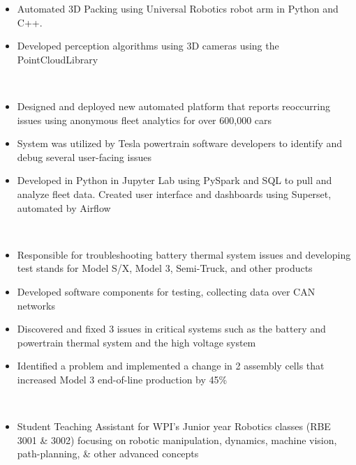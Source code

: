 {}
    \begin{itemize}
        \item Automated 3D Packing using Universal Robotics robot arm in Python and C++.
        \item Developed perception algorithms using 3D cameras using the PointCloudLibrary
    \end{itemize}
\divider\\
    \begin{itemize}
        \item Designed and deployed new automated platform that reports reoccurring issues using anonymous fleet analytics for over 600,000 cars
        \item System was utilized by Tesla powertrain software developers to identify and debug several user-facing issues
        \item Developed in Python in Jupyter Lab using PySpark and SQL to pull and analyze fleet data. Created user interface and dashboards using Superset, automated by Airflow
    \end{itemize}
\divider\\
    \begin{itemize}
        \item Responsible for troubleshooting battery thermal system issues and developing test stands for Model S/X, Model 3, Semi-Truck, and other products
        \item Developed software components for testing, collecting data over CAN networks
        \item Discovered and fixed 3 issues in critical systems such as the battery and powertrain thermal system and the high voltage system
        \item Identified a problem and implemented a change in 2 assembly cells that increased Model 3 end-of-line production by 45\%
    \end{itemize}
\divider\\
    \begin{itemize}
        \item Student Teaching Assistant for WPI’s Junior year Robotics classes (RBE 3001 \& 3002) focusing on robotic manipulation, dynamics, machine vision, path-planning, \& other advanced concepts
    \end{itemize}